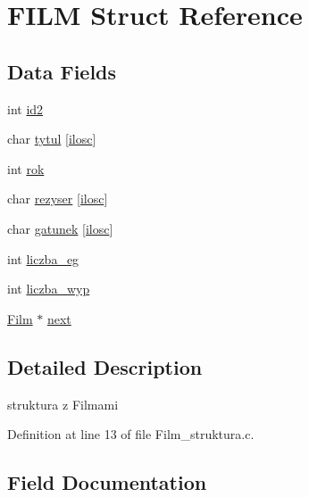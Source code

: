 \hypertarget{struct_f_i_l_m}{}\section{F\+I\+LM Struct Reference}
\label{struct_f_i_l_m}
\subsection*{Data Fields}
\begin{DoxyCompactItemize}
\item 
int \hyperlink{struct_f_i_l_m_abff687cb542be70b85afa82d0c3496d0}{id2}
\item 
char \hyperlink{struct_f_i_l_m_a4db90baba08e1990c11d4cd33502c224}{tytul} \mbox{[}\hyperlink{_wypozyczenie__struktura_8c_a802c84452854799df868a4a660d3d58a}{ilosc}\mbox{]}
\item 
int \hyperlink{struct_f_i_l_m_ab216bb7eaebb4b2665b3a7e9d52d98d0}{rok}
\item 
char \hyperlink{struct_f_i_l_m_a0e0f2d3232f2bec0dc12fea4b77b01d2}{rezyser} \mbox{[}\hyperlink{_wypozyczenie__struktura_8c_a802c84452854799df868a4a660d3d58a}{ilosc}\mbox{]}
\item 
char \hyperlink{struct_f_i_l_m_a08932be7066fddb81f3c046fbed072f5}{gatunek} \mbox{[}\hyperlink{_wypozyczenie__struktura_8c_a802c84452854799df868a4a660d3d58a}{ilosc}\mbox{]}
\item 
int \hyperlink{struct_f_i_l_m_a9782bbc38aea3fffcf052c96587b387c}{liczba\+\_\+eg}
\item 
int \hyperlink{struct_f_i_l_m_a5885662d45b08335111e160dbafd0085}{liczba\+\_\+wyp}
\item 
\hyperlink{_film__struktura_8c_ad2e5228e76da3af7ebed978bbc379920}{Film} $\ast$ \hyperlink{struct_f_i_l_m_a4c4d7d17d408c571231b093758ae0775}{next}
\end{DoxyCompactItemize}


\subsection{Detailed Description}
struktura z Filmami 

Definition at line 13 of file Film\+\_\+struktura.\+c.



\subsection{Field Documentation}
\mbox{\label{struct_f_i_l_m_a08932be7066fddb81f3c046fbed072f5}} 
